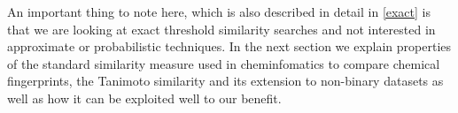 An important thing to note here, which is also described in detail in \autoref{exact} is that we are looking at exact threshold similarity searches and not interested in approximate or probabilistic techniques. In the next section we explain properties of the standard similarity measure used in cheminfomatics to compare chemical fingerprints, the Tanimoto similarity and its extension to non-binary datasets as well as how it can be exploited well to our benefit.  


